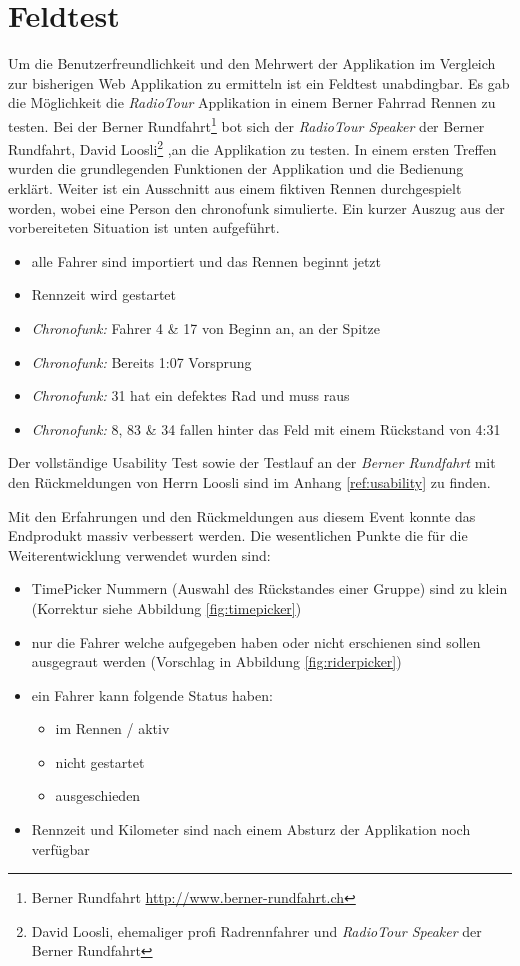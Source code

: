 \section{Feldtest}

Um die Benutzerfreundlichkeit und den Mehrwert der Applikation im Vergleich zur bisherigen Web Applikation zu ermitteln ist ein Feldtest unabdingbar. Es gab die Möglichkeit die \textit{RadioTour} Applikation in einem Berner Fahrrad Rennen zu testen. Bei der Berner Rundfahrt\footnote{Berner Rundfahrt \url{http://www.berner-rundfahrt.ch}} bot sich der  \textit{RadioTour Speaker} der Berner Rundfahrt, David Loosli\footnote{David Loosli, ehemaliger profi Radrennfahrer und \textit{RadioTour Speaker} der Berner Rundfahrt} ,an die Applikation zu testen. In einem ersten Treffen wurden die grundlegenden Funktionen der Applikation und die Bedienung erklärt. Weiter ist ein Ausschnitt aus einem fiktiven Rennen durchgespielt worden, wobei eine Person den \gls{chronofunk} simulierte. Ein kurzer Auszug aus der vorbereiteten Situation ist unten aufgeführt.

\begin{itemize}
\item alle Fahrer sind importiert und das Rennen beginnt jetzt
\item Rennzeit wird gestartet
\item \textit{Chronofunk:} Fahrer 4 \& 17 von Beginn an, an der Spitze
\item \textit{Chronofunk:} Bereits 1:07 Vorsprung
\item \textit{Chronofunk:} 31 hat ein defektes Rad und muss raus
\item \textit{Chronofunk:} 8, 83 \& 34 fallen hinter das Feld mit einem Rückstand von 4:31
\end{itemize}

Der vollständige Usability Test sowie der Testlauf an der \textit{Berner Rundfahrt} mit den Rückmeldungen von Herrn Loosli sind im Anhang \ref{ref:usability} zu finden.

Mit den Erfahrungen und den Rückmeldungen aus diesem Event konnte das Endprodukt massiv verbessert werden. Die wesentlichen Punkte die für die Weiterentwicklung verwendet wurden sind:
\begin{itemize}
\item TimePicker Nummern (Auswahl des Rückstandes einer Gruppe) sind zu klein (Korrektur siehe Abbildung \ref{fig:timepicker})
\item nur die Fahrer welche aufgegeben haben oder nicht erschienen sind sollen ausgegraut werden (Vorschlag in Abbildung \ref{fig:riderpicker})
\item ein Fahrer kann folgende Status haben:
\begin{itemize}
\item im Rennen / aktiv
\item nicht gestartet
\item ausgeschieden
\end{itemize}
\item Rennzeit und Kilometer sind nach einem Absturz der Applikation noch verfügbar
\end{itemize}


